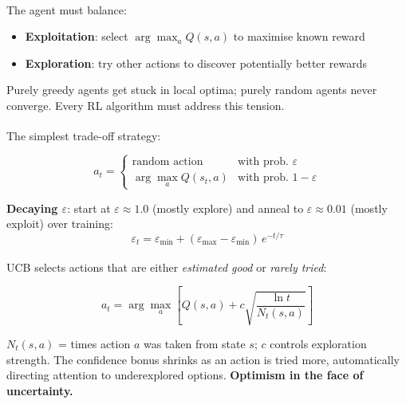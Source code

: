     \begin{tcbitemize}[ skin=sectionraster ]

    \tcbitem[title={The Exploration--Exploitation Trade-off}, raster multicolumn=3]
    The agent must balance:\textsuperscript{\cite[][pp.~338--339]{hurbansGrokkingArtificialIntelligence2020}}
    \begin{itemize}
        \item \textbf{Exploitation}: select $\arg\max_a Q(s,a)$ to maximise
              known reward
        \item \textbf{Exploration}: try other actions to discover potentially
              better rewards
    \end{itemize}

    Purely greedy agents get stuck in local optima; purely random agents
    never converge. Every RL algorithm must address this tension.

    \tcbitem[title=$\varepsilon$-Greedy Strategy, raster multicolumn=3]
    The simplest trade-off
    strategy:\textsuperscript{\cite[][p.~339]{hurbansGrokkingArtificialIntelligence2020}}

    \begin{equation}
        a_t = \begin{cases}
            \text{random action} & \text{with prob.\ } \varepsilon \\
            \arg\max_a Q(s_t,a) & \text{with prob.\ } 1{-}\varepsilon
        \end{cases}
    \end{equation}

    \textbf{Decaying $\varepsilon$}: start at $\varepsilon \approx 1.0$ (mostly
    explore) and anneal to $\varepsilon \approx 0.01$ (mostly exploit) over
    training:
    \[ \varepsilon_t = \varepsilon_{\min}
       + (\varepsilon_{\max} - \varepsilon_{\min})\,e^{-t/\tau} \]

    \tcbitem[title={Upper Confidence Bound (UCB)}, raster multicolumn=3]
    UCB selects actions that are either \emph{estimated good} or
    \emph{rarely tried}:\textsuperscript{\cite[][Ch.~2]{suttonReinforcementLearningIntroduction2018}}

    \begin{equation}
        a_t = \arg\max_a \left[ Q(s,a) + c\sqrt{\frac{\ln t}{N_t(s,a)}} \right]
    \end{equation}

    $N_t(s,a)$ = times action $a$ was taken from state $s$; $c$ controls
    exploration strength. The confidence bonus shrinks as an action is tried
    more, automatically directing attention to underexplored options.
    \textbf{Optimism in the face of uncertainty.}


\end{tcbitemize}
